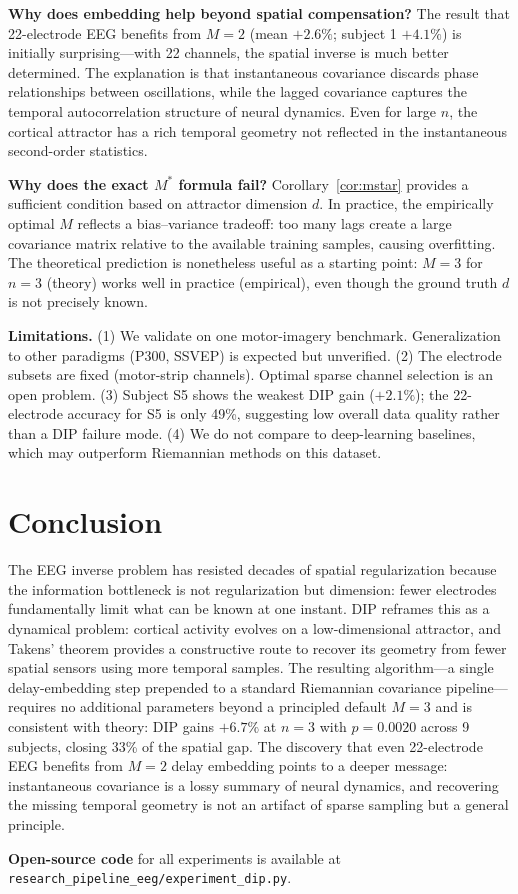 \documentclass[journal]{IEEEtran}
\begin{document}
\textbf{Why does embedding help beyond spatial compensation?} The result that 22-electrode EEG benefits from $M=2$ (mean $+2.6\%$; subject 1 $+4.1\%$) is initially surprising---with 22 channels, the spatial inverse is much better determined. The explanation is that instantaneous covariance discards phase relationships between oscillations, while the lagged covariance captures the temporal autocorrelation structure of neural dynamics. Even for large $n$, the cortical attractor has a rich temporal geometry not reflected in the instantaneous second-order statistics.

\textbf{Why does the exact $M^*$ formula fail?} Corollary~\ref{cor:mstar} provides a sufficient condition based on attractor dimension $d$. In practice, the empirically optimal $M$ reflects a bias--variance tradeoff: too many lags create a large covariance matrix relative to the available training samples, causing overfitting. The theoretical prediction is nonetheless useful as a starting point: $M=3$ for $n=3$ (theory) works well in practice (empirical), even though the ground truth $d$ is not precisely known.

\textbf{Limitations.}
(1) We validate on one motor-imagery benchmark. Generalization to other paradigms (P300, SSVEP) is expected but unverified.
(2) The electrode subsets are fixed (motor-strip channels). Optimal sparse channel selection is an open problem.
(3) Subject S5 shows the weakest DIP gain ($+2.1\%$); the 22-electrode accuracy for S5 is only 49\%, suggesting low overall data quality rather than a DIP failure mode.
(4) We do not compare to deep-learning baselines, which may outperform Riemannian methods on this dataset.

\section{Conclusion}
\label{sec:conclusion}

The EEG inverse problem has resisted decades of spatial regularization because the information bottleneck is not regularization but dimension: fewer electrodes fundamentally limit what can be known at one instant. DIP reframes this as a dynamical problem: cortical activity evolves on a low-dimensional attractor, and Takens' theorem provides a constructive route to recover its geometry from fewer spatial sensors using more temporal samples. The resulting algorithm---a single delay-embedding step prepended to a standard Riemannian covariance pipeline---requires no additional parameters beyond a principled default $M=3$ and is consistent with theory: DIP gains $+6.7\%$ at $n=3$ with $p=0.0020$ across 9 subjects, closing 33\% of the spatial gap. The discovery that even 22-electrode EEG benefits from $M=2$ delay embedding points to a deeper message: instantaneous covariance is a lossy summary of neural dynamics, and recovering the missing temporal geometry is not an artifact of sparse sampling but a general principle.

\textbf{Open-source code} for all experiments is available at \texttt{research\_pipeline\_eeg/experiment\_dip.py}.



\end{document}

